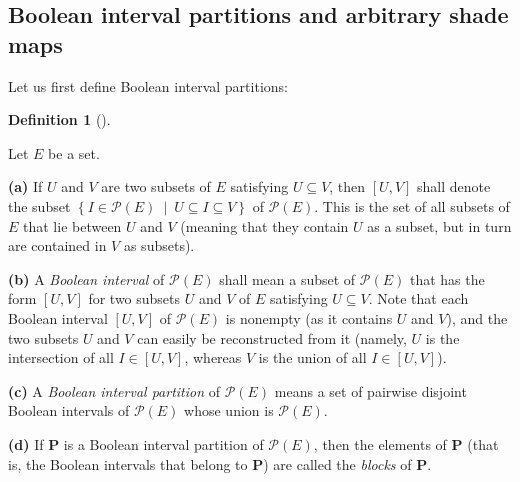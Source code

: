 \documentclass[numbers=enddot,12pt,final,onecolumn]{scrartcl}%
\theoremstyle{definition}
\newtheorem{defi}[theo]{Definition}
\newenvironment{definition}[1][]
{\begin{defi}[#1]\begin{leftbar}}
{\end{leftbar}\end{defi}}
\begin{document}
\subsection{\label{subsect.abstract.bip}Boolean interval partitions and
arbitrary shade maps}

Let us first define Boolean interval partitions:

\begin{definition}
\label{def.bip.bip}Let $E$ be a set.

\textbf{(a)} If $U$ and $V$ are two subsets of $E$ satisfying $U\subseteq V$,
then $\left[  U,V\right]  $ shall denote the subset $\left\{  I\in
\mathcal{P}\left(  E\right)  \ \mid\ U\subseteq I\subseteq V\right\}  $ of
$\mathcal{P}\left(  E\right)  $. This is the set of all subsets of $E$ that
lie between $U$ and $V$ (meaning that they contain $U$ as a subset, but in
turn are contained in $V$ as subsets).

\textbf{(b)} A \emph{Boolean interval} of $\mathcal{P}\left(  E\right)  $
shall mean a subset of $\mathcal{P}\left(  E\right)  $ that has the form
$\left[  U,V\right]  $ for two subsets $U$ and $V$ of $E$ satisfying
$U\subseteq V$. Note that each Boolean interval $\left[  U,V\right]  $ of
$\mathcal{P}\left(  E\right)  $ is nonempty (as it contains $U$ and $V$), and
the two subsets $U$ and $V$ can easily be reconstructed from it (namely, $U$
is the intersection of all $I\in\left[  U,V\right]  $, whereas $V$ is the
union of all $I\in\left[  U,V\right]  $).

\textbf{(c)} A \emph{Boolean interval partition} of $\mathcal{P}\left(
E\right)  $ means a set of pairwise disjoint Boolean intervals of
$\mathcal{P}\left(  E\right)  $ whose union is $\mathcal{P}\left(  E\right)  $.

\textbf{(d)} If $\mathbf{P}$ is a Boolean interval partition of $\mathcal{P}%
\left(  E\right)  $, then the elements of $\mathbf{P}$ (that is, the Boolean
intervals that belong to $\mathbf{P}$) are called the \emph{blocks} of
$\mathbf{P}$.
\end{definition}
\end{document}
